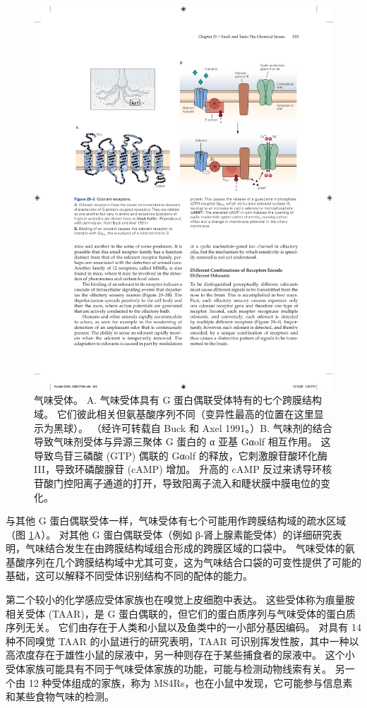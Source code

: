 \begin{figure}[htbp]
	\centering
	\includegraphics[width=0.95\linewidth]{chap29/fig_29_3}
	\caption{气味受体。 A. 气味受体具有 G 蛋白偶联受体特有的七个跨膜结构域。 它们彼此相关但氨基酸序列不同（变异性最高的位置在这里显示为黑球）。 （经许可转载自 Buck 和 Axel 1991。）B. 气味剂的结合导致气味剂受体与异源三聚体 G 蛋白的 α 亚基 Gαolf 相互作用。 这导致鸟苷三磷酸 (GTP) 偶联的 Gαolf 的释放，它刺激腺苷酸环化酶 III，导致环磷酸腺苷 (cAMP) 增加。 升高的 cAMP 反过来诱导环核苷酸门控阳离子通道的打开，导致阳离子流入和睫状膜中膜电位的变化。}
	\label{fig:29_3}
\end{figure}


与其他 G 蛋白偶联受体一样，气味受体有七个可能用作跨膜结构域的疏水区域（图 \ref{fig:29_3}A）。 对其他 G 蛋白偶联受体（例如 β-肾上腺素能受体）的详细研究表明，气味结合发生在由跨膜结构域组合形成的跨膜区域的口袋中。 气味受体的氨基酸序列在几个跨膜结构域中尤其可变，这为气味结合口袋的可变性提供了可能的基础，这可以解释不同受体识别结构不同的配体的能力。

第二个较小的化学感应受体家族也在嗅觉上皮细胞中表达。 这些受体称为痕量胺相关受体 (TAAR)，是 G 蛋白偶联的，但它们的蛋白质序列与气味受体的蛋白质序列无关。 它们由存在于人类和小鼠以及鱼类中的一小部分基因编码。 对具有 14 种不同嗅觉 TAAR 的小鼠进行的研究表明，TAAR 可识别挥发性胺，其中一种以高浓度存在于雄性小鼠的尿液中，另一种则存在于某些捕食者的尿液中。 这个小受体家族可能具有不同于气味受体家族的功能，可能与检测动物线索有关。 另一个由 12 种受体组成的家族，称为 MS4Rs，也在小鼠中发现，它可能参与信息素和某些食物气味的检测。

